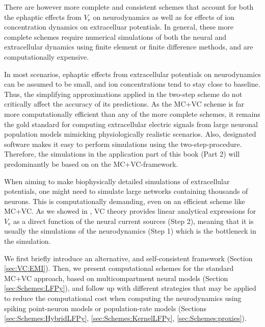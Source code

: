 There are\sntxt{,} however\sntxt{,} more complete and consistent schemes that account for both the ephaptic effects from $V_\mathrm{e}$  on neurodynamics as well as for effects of ion concentration dynamics on  extracelluar potentials. In general, these more complete schemes require numerical simulations of both the neural and extracellular dynamics using finite element or finite difference methods, and are  computationally expensive.

In most scenarios, ephaptic effects from extracellular potentials on neurodynamics can be assumed to be small, and ion concentrations tend to stay close to baseline. Thus, the simplifying approximations applied in the two-step scheme do not critically affect the accuracy of its predictions. As the MC+VC scheme is far more computationally efficient than any of the more complete schemes, it remains the gold standard for computing extracellular electric signals from large neuronal population models mimicking physiologically realistic scenarios. Also, designated software  makes it easy to perform simulations using the two-step-procedure. Therefore, the simulations in the application part of this book (Part 2) will predominantly be based on on the MC+VC-framework.

When aiming to make biophysically detailed simulations of extracellular potentials, one might need to simulate large networks containing thousands of neurons. This is computationally demanding, even on an efficient scheme like MC+VC.
 As we showed in , VC theory provides linear analytical expressions for $V_\mathrm{e}$  as a direct function of the neural current sources (Step 2), meaning that it is usually the simulations of the neurodynamics (Step 1) which is the bottleneck in the simulation. 

We first briefly introduce an alternative, and self-consistent framework (Section \ref{sec:VC:EMI}).
Then, we present computational schemes for the standard MC+VC approach, based on multicompartment neural models (Section \ref{sec:Schemes:LFPy}), and follow up with different strategies that may be applied to reduce the computational cost when computing the neurodynamics using spiking point-neuron models or population-rate models (Sections \ref{sec:Schemes:HybridLFPy}, \ref{sec:Schemes:KernelLFPy}, \ref{sec:Schemes:proxies}). 

